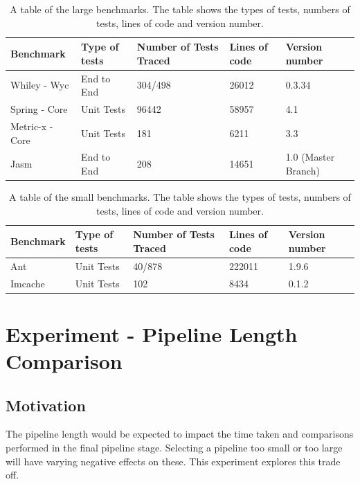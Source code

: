 \begin{table}[H]
\centering
\begin{tabular}{|l|l|l|l|l|}
\hline
{\bf Benchmark}    & {\bf Type of tests}   &  {\bf Number of Tests Traced} & {\bf Lines of code} & {\bf Version number}   \\ \hline
Whiley - Wyc      & End to End  &    304/498   &   26012       &       0.3.34   \\ \hline
Spring - Core   & Unit Tests  &  96442  &    58957      & 4.1 \\ \hline
Metric-x - Core &  Unit Tests  &  181 &    6211      & 3.3 \\ \hline
Jasm              &   End to End   &  208     &     14651     & 1.0 (Master Branch) \\ \hline

\end{tabular}
\caption{A table of the large benchmarks. The table shows the types of tests, numbers of tests, lines of code and version number.}
\label{large_test}
\end{table}

\begin{table}[H]
\centering
\begin{tabular}{|l|l|l|l|l|}
\hline
{\bf Benchmark} & {\bf Type of tests}   & {\bf Number of Tests Traced} & {\bf Lines of code} & {\bf Version number}  \\ \hline
Ant             &   Unit Tests    &     40/878     & 222011 & 1.9.6 \\ \hline
Imcache &       Unit Tests    &    102        & 8434  & 0.1.2 \\ \hline
\end{tabular}
\caption{A table of the small benchmarks. The table shows the types of tests, numbers of tests, lines of code and version number.}
\label{small_test}
\end{table}

\section{Experiment  - Pipeline Length Comparison }
\label{sec:pipelineEva}

\subsection{Motivation}
The pipeline length would be expected to impact the time taken and comparisons performed in the final pipeline stage. Selecting a pipeline too small or too large will have varying negative effects on these. This experiment explores this trade off.

